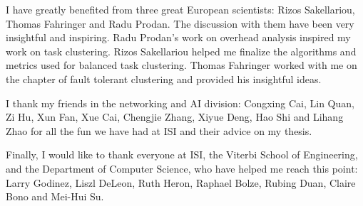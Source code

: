 I have greatly benefited from three great European scientists: Rizos Sakellariou, Thomas Fahringer and Radu Prodan. The discussion with them have been very insightful and inspiring. Radu Prodan's work on overhead analysis inspired my work on task clustering. Rizos Sakellariou helped me finalize the algorithms and metrics used for balanced task clustering. Thomas Fahringer worked with me on the chapter of fault tolerant clustering and provided his insightful ideas. 

I thank my friends in the networking and AI division: Congxing Cai, Lin Quan, Zi Hu, Xun Fan, Xue Cai, Chengjie Zhang, Xiyue Deng, Hao Shi and Lihang Zhao for all the fun we have had at ISI and their advice on my thesis. 

Finally, I would like to thank everyone at ISI, the Viterbi School of Engineering, and the Department of Computer Science, who have helped me reach this point: Larry Godinez, Liszl DeLeon, Ruth Heron, Raphael Bolze, Rubing Duan, Claire Bono and Mei-Hui Su. 

